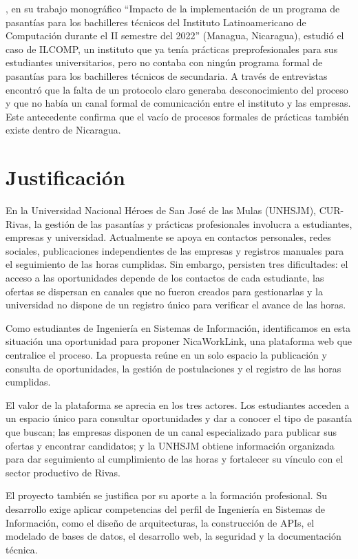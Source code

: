 \textcite{luquez2022}, en su trabajo monográfico ``Impacto de la implementación de un programa de pasantías para los bachilleres técnicos del Instituto Latinoamericano de Computación durante el II semestre del 2022'' (Managua, Nicaragua), estudió el caso de ILCOMP, un instituto que ya tenía prácticas preprofesionales para sus estudiantes universitarios, pero no contaba con ningún programa formal de pasantías para los bachilleres técnicos de secundaria. A través de entrevistas encontró que la falta de un protocolo claro generaba desconocimiento del proceso y que no había un canal formal de comunicación entre el instituto y las empresas. Este antecedente confirma que el vacío de procesos formales de prácticas también existe dentro de Nicaragua.

\newpage

\section{Justificación}

En la Universidad Nacional Héroes de San José de las Mulas (UNHSJM), CUR-Rivas, la gestión de las pasantías y prácticas profesionales involucra a estudiantes, empresas y universidad. Actualmente se apoya en contactos personales, redes sociales, publicaciones independientes de las empresas y registros manuales para el seguimiento de las horas cumplidas. Sin embargo, persisten tres dificultades: el acceso a las oportunidades depende de los contactos de cada estudiante, las ofertas se dispersan en canales que no fueron creados para gestionarlas y la universidad no dispone de un registro único para verificar el avance de las horas.

Como estudiantes de Ingeniería en Sistemas de Información, identificamos en esta situación una oportunidad para proponer NicaWorkLink, una plataforma web que centralice el proceso. La propuesta reúne en un solo espacio la publicación y consulta de oportunidades, la gestión de postulaciones y el registro de las horas cumplidas.

El valor de la plataforma se aprecia en los tres actores. Los estudiantes acceden a un espacio único para consultar oportunidades y dar a conocer el tipo de pasantía que buscan; las empresas disponen de un canal especializado para publicar sus ofertas y encontrar candidatos; y la UNHSJM obtiene información organizada para dar seguimiento al cumplimiento de las horas y fortalecer su vínculo con el sector productivo de Rivas.

El proyecto también se justifica por su aporte a la formación profesional. Su desarrollo exige aplicar competencias del perfil de Ingeniería en Sistemas de Información, como el diseño de arquitecturas, la construcción de APIs, el modelado de bases de datos, el desarrollo web, la seguridad y la documentación técnica.

